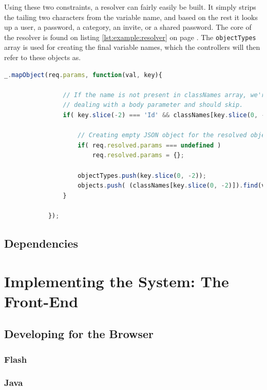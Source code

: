 		Using these two constraints, a resolver can fairly easily be built. It simply strips the tailing two characters from the variable name, and based on the rest it looks up a user, a password, a category, an invite, or a shared password. The core of the resolver is found on listing \ref{lst:example:resolver} on page \pageref{lst:example:resolver}. The \verb=objectTypes= array is used for creating the final variable names, which the controllers will then refer to these objects as.

		\begin{lstlisting}[gobble=12,language=JavaScript,caption={Object resolver middleware},label={lst:example:resolver}]
            _.mapObject(req.params, function(val, key){
            
                // If the name is not present in classNames array, we're
                // dealing with a body parameter and should skip.
                if( key.slice(-2) === 'Id' && classNames[key.slice(0, -2)] !== undefined ){
                    
                    // Creating empty JSON object for the resolved objects to be placed in
                    if( req.resolved.params === undefined ) 
                        req.resolved.params = {};
                    
                    objectTypes.push(key.slice(0, -2));
                    objects.push( (classNames[key.slice(0, -2)]).find(val) );
                }
            
            });
		\end{lstlisting}

	\section{Dependencies}


\chapter{Implementing the System: The Front-End}
	\section{Developing for the Browser}
		\subsection{Flash}
		\subsection{Java}

